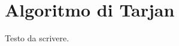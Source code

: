 
\ifsubfile
\usepackage{../settings/subfile}
\appendix


\fi
\chapter{Algoritmo di Tarjan}

Testo da scrivere.

\ifsubfile

\fi